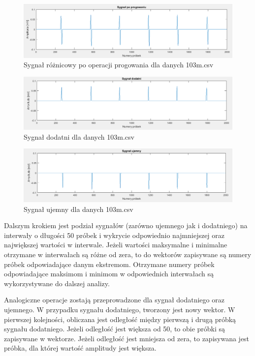 \documentclass[10pt,a4paper]{article}
\begin{document}
\begin{figure}
  	\centering
    \includegraphics[width=1\textwidth]{dom15}
    \caption{Sygnał różnicowy po operacji progowania dla danych 103m.csv}
  	\label{fig:dom15}
\end{figure} 

\begin{figure}
  	\centering
    \includegraphics[width=1\textwidth]{dom16}
    \caption{Sygnał dodatni dla danych 103m.csv}
  	\label{fig:dom16}
\end{figure} 

\begin{figure}
  	\centering
    \includegraphics[width=1\textwidth]{dom17}
    \caption{Sygnał ujemny dla danych 103m.csv}
  	\label{fig:dom17}
\end{figure}

Dalszym krokiem jest podział sygnałów (zarówno ujemnego jak i dodatniego) na interwały o długości 50 próbek i wykrycie odpowiednio najmniejszej oraz największej wartości w interwale. Jeżeli wartości maksymalne i minimalne otrzymane w interwałach są różne od zera, to do wektorów zapisywane są numery próbek odpowiadające danym ekstremom. Otrzymane numery próbek odpowiadające maksimom i minimom w odpowiednich interwałach są wykorzystywane do dalszej analizy. 

Analogiczne operacje zostają przeprowadzone dla sygnał dodatniego oraz ujemnego. W przypadku sygnału dodatniego, tworzony jest nowy wektor. W pierwszej kolejności, obliczana jest odległość między pierwszą i drugą próbką sygnału dodatniego. Jeżeli odległość jest większa od 50, to obie próbki są zapisywane w wektorze. Jeżeli odległość jest mniejsza od zera, to zapisywana jest próbka, dla której wartość amplitudy jest większa. 
\end{document}
